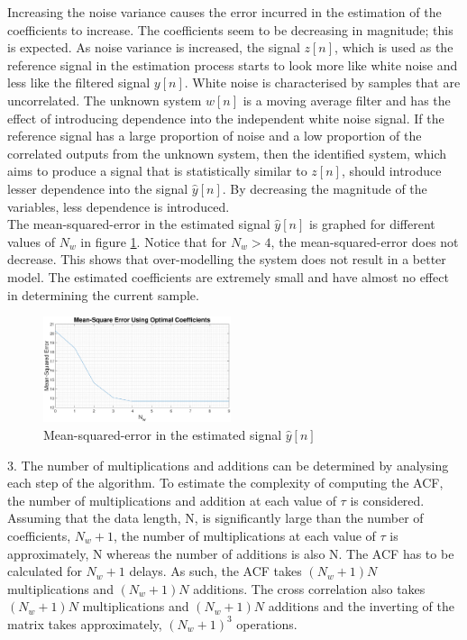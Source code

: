 \documentclass{article}
\begin{document}
Increasing the noise variance causes the error incurred in the estimation of the coefficients to increase. The coefficients seem to be decreasing in magnitude; this is expected. As noise variance is increased, the signal $z[n]$, which is used as the reference signal in the estimation process starts to look more like white noise and less like the filtered signal $y[n]$. White noise is characterised by samples that are uncorrelated. The unknown system $w[n]$ is a moving average filter and has the effect of introducing dependence into the independent white noise signal. If the reference signal has a large proportion of noise and a low proportion of the correlated outputs from the unknown system, then the identified system, which aims to produce a signal that is statistically similar to $z[n]$, should introduce lesser dependence into the signal $\hat{y}[n]$. By decreasing the magnitude of the variables, less dependence is introduced.\\

The mean-squared-error in the estimated signal $\hat{y}[n]$ is graphed for different values of $N_{w}$ in figure \ref{fig:mse_wiener}. Notice that for $N_{w}>4$, the mean-squared-error does not decrease. This shows that over-modelling the system does not result in a better model. The estimated coefficients are extremely small and have almost no effect in determining the current sample. 

\begin{figure}[H]
    \centering
    \includegraphics[width=0.49\textwidth]{mse_optimal_coeffs}
    \caption{Mean-squared-error in the estimated signal $\hat{y}[n]$}
    \label{fig:mse_wiener}
\end{figure}

3. The number of multiplications and additions can be determined by analysing each step of the algorithm. To estimate the complexity of computing the ACF, the number of multiplications and addition at each value of $\tau$ is considered. Assuming that the data length, N, is significantly large than the number of coefficients, $N_{w}+1$, the number of multiplications at each value of $\tau$ is approximately, N whereas the number of additions is also N. The ACF has to be calculated for $N_{w}+1$ delays. As such, the ACF takes $(N_{w}+1)N$ multiplications and $(N_{w}+1)N$ additions. The cross correlation also takes $(N_{w}+1)N$ multiplications and $(N_{w}+1)N$ additions and the inverting of the matrix takes approximately, $(N_{w}+1)^{3}$ operations.
\end{document}
